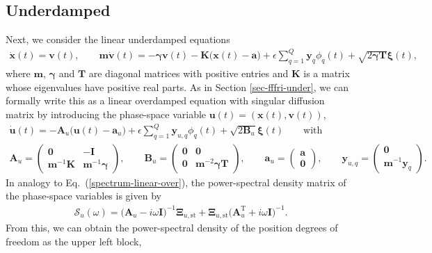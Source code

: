 \documentclass[aps,pre,twocolumn,superscriptaddress,notitlepage]{revtex4-2}
\newcommand{\n}{\nonumber}
\newcommand{\bmc}[1]{\bm{\mathcal{#1}}}
\renewcommand{\eqref}[1]{Eq.~(\ref{#1})}
\begin{document}
\subsection{Underdamped} \label{sec-linear-under}
Next, we consider the linear underdamped equations
\begin{align}
\dot{\bm{x}}(t) = \bm{v}(t), \qquad \bm{m} \dot{\bm{v}}(t) = - \bm{\gamma} \bm{v}(t) - \bm{K} \big(\bm{x}(t) - \bm{a} \big) + \epsilon \sum_{q=1}^Q \bm{y}_q \phi_q(t) + \sqrt{2 \bm{\gamma} \bm{T}} \bm{\xi}(t),
\end{align}
where $\bm{m}$, $\bm{\gamma}$ and $\bm{T}$ are diagonal matrices with positive entries and $\bm{K}$ is a matrix whose eigenvalues have positive real parts.
As in Section \ref{sec-fffri-under}, we can formally write this as a linear overdamped equation with singular diffusion matrix by introducing the phase-space variable $\bm{u}(t) = (\bm{x}(t),\bm{v}(t))$,
\begin{gather}
\dot{\bm{u}}(t) = - \bm{A}_u \big( \bm{u}(t) - \bm{a}_u \big) + \epsilon \sum_{q=1}^Q \bm{y}_{u,q} \phi_q(t) + \sqrt{2 \bm{B}_u} \bm{\xi}(t) \qquad \text{with} \\
\bm{A}_u = \begin{pmatrix} \bm{0} & - \bm{I} \\ \bm{m}^{-1} \bm{K} & \bm{m}^{-1} \bm{\gamma} \end{pmatrix}, \qquad \bm{B}_u = \begin{pmatrix} \bm{0} & \bm{0} \\ \bm{0} & \bm{m}^{-2} \bm{\gamma} \bm{T} \end{pmatrix}, \qquad \bm{a}_u = \begin{pmatrix} \bm{a} \\ \bm{0} \end{pmatrix}, \qquad \bm{y}_{u,q} = \begin{pmatrix} \bm{0} \\ \bm{m}^{-1} \bm{y}_q \end{pmatrix} \n .
\end{gather}
In analogy to \eqref{spectrum-linear-over}, the power-spectral density matrix of the phase-space variables is given by
\begin{align}
\bmc{S}_u(\omega) = \big( \bm{A}_u - i \omega \bm{I}\big)^{-1} \bm{\Xi}_{u,\text{st}} + \bm{\Xi}_{u,\text{st}} \big( \bm{A}_u^\text{T} + i \omega \bm{I}\big)^{-1} \label{spectral-linear-under}.
\end{align}
From this, we can obtain the power-spectral density of the position degrees of freedom as the upper left block,
\end{document}
